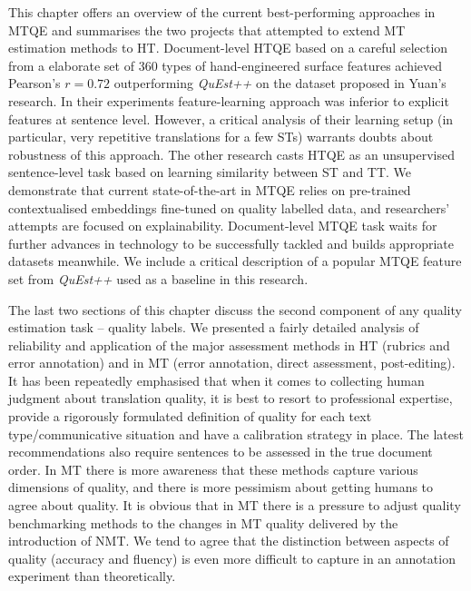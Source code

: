 This chapter offers an overview of the current best-performing approaches in MTQE and summarises the two projects that attempted to extend MT estimation methods to HT. 
Document-level HTQE based on a careful selection from a elaborate set of 360 types of hand-engineered surface features achieved Pearson's $r=0.72$ outperforming \textit{QuEst++} on the dataset proposed in Yuan's \citeyear{Yuan2018} research. In their experiments feature-learning approach was inferior to explicit features at sentence level. However, a critical analysis of their learning setup (in particular, very repetitive translations for a few STs) warrants doubts about robustness of this approach.
The other research casts HTQE as an unsupervised sentence-level task based on learning similarity between ST and TT.
We demonstrate that current state-of-the-art in MTQE relies on pre-trained contextualised embeddings fine-tuned on quality labelled data, and researchers' attempts are focused on explainability. Document-level MTQE task waits for further advances in technology to be successfully tackled and builds appropriate datasets meanwhile. 
We include a critical description of a popular MTQE feature set from \textit{QuEst++} used as a baseline in this research.  

The last two sections of this chapter discuss the second component of any quality estimation task -- quality labels. 
We presented a fairly detailed analysis of reliability and application of the major assessment methods in HT (rubrics and error annotation) and in MT (error annotation, direct assessment, post-editing). It has been repeatedly emphasised that when it comes to collecting human judgment about translation quality, it is best to resort to professional expertise, provide a rigorously formulated definition of quality for each text type/communicative situation and have a calibration strategy in place. The latest recommendations also require sentences to be assessed in the true document order.
In MT there is more awareness that these methods capture various dimensions of quality, and there is more pessimism about getting humans to agree about quality. It is obvious that in MT there is a pressure to adjust quality benchmarking methods to the changes in MT quality delivered by the introduction of NMT. 
We tend to agree that the distinction between aspects of quality (accuracy and fluency) is even more difficult to capture in an annotation experiment than theoretically. 


